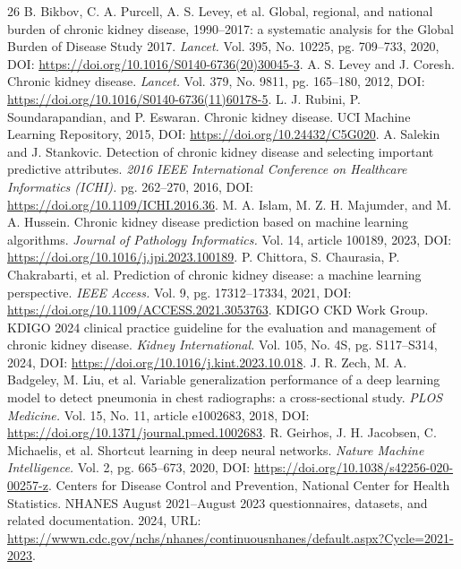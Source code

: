 \documentclass[12pt]{article}
\begin{document}
\begin{thebibliography}{26}
 B. Bikbov, C. A. Purcell, A. S. Levey, et al. Global, regional, and national burden of chronic kidney disease, 1990--2017: a systematic analysis for the Global Burden of Disease Study 2017. \emph{Lancet.} Vol. 395, No. 10225, pg. 709--733, 2020, DOI: \url{https://doi.org/10.1016/S0140-6736(20)30045-3}.
 A. S. Levey and J. Coresh. Chronic kidney disease. \emph{Lancet.} Vol. 379, No. 9811, pg. 165--180, 2012, DOI: \url{https://doi.org/10.1016/S0140-6736(11)60178-5}.
 L. J. Rubini, P. Soundarapandian, and P. Eswaran. Chronic kidney disease. UCI Machine Learning Repository, 2015, DOI: \url{https://doi.org/10.24432/C5G020}.
 A. Salekin and J. Stankovic. Detection of chronic kidney disease and selecting important predictive attributes. \emph{2016 IEEE International Conference on Healthcare Informatics (ICHI).} pg. 262--270, 2016, DOI: \url{https://doi.org/10.1109/ICHI.2016.36}.
 M. A. Islam, M. Z. H. Majumder, and M. A. Hussein. Chronic kidney disease prediction based on machine learning algorithms. \emph{Journal of Pathology Informatics.} Vol. 14, article 100189, 2023, DOI: \url{https://doi.org/10.1016/j.jpi.2023.100189}.
 P. Chittora, S. Chaurasia, P. Chakrabarti, et al. Prediction of chronic kidney disease: a machine learning perspective. \emph{IEEE Access.} Vol. 9, pg. 17312--17334, 2021, DOI: \url{https://doi.org/10.1109/ACCESS.2021.3053763}.
 KDIGO CKD Work Group. KDIGO 2024 clinical practice guideline for the evaluation and management of chronic kidney disease. \emph{Kidney International.} Vol. 105, No. 4S, pg. S117--S314, 2024, DOI: \url{https://doi.org/10.1016/j.kint.2023.10.018}.
 J. R. Zech, M. A. Badgeley, M. Liu, et al. Variable generalization performance of a deep learning model to detect pneumonia in chest radiographs: a cross-sectional study. \emph{PLOS Medicine.} Vol. 15, No. 11, article e1002683, 2018, DOI: \url{https://doi.org/10.1371/journal.pmed.1002683}.
 R. Geirhos, J. H. Jacobsen, C. Michaelis, et al. Shortcut learning in deep neural networks. \emph{Nature Machine Intelligence.} Vol. 2, pg. 665--673, 2020, DOI: \url{https://doi.org/10.1038/s42256-020-00257-z}.
 Centers for Disease Control and Prevention, National Center for Health Statistics. NHANES August 2021--August 2023 questionnaires, datasets, and related documentation. 2024, URL: \url{https://wwwn.cdc.gov/nchs/nhanes/continuousnhanes/default.aspx?Cycle=2021-2023}.

\end{thebibliography}
\end{document}
